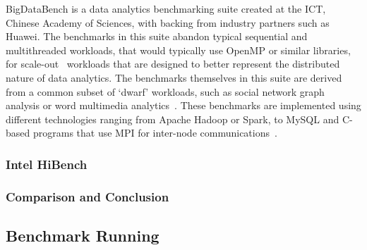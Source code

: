 \documentclass[12pt,a4paper]{article}
\begin{document}
            	BigDataBench is a data analytics benchmarking suite created at the ICT, Chinese Academy of Sciences, with backing from industry partners such as Huawei. The benchmarks in this suite abandon typical sequential and multithreaded workloads, that would typically use OpenMP or similar libraries, for scale-out~\cite{big-data-bench-home} workloads that are designed to better represent the distributed nature of data analytics. The benchmarks themselves in this suite are derived from a common subset of `dwarf' workloads, such as social network graph analysis or word multimedia analytics~\cite{dwarf-workloads-big-data}. These benchmarks are implemented using different technologies ranging from Apache Hadoop or Spark, to MySQL and C-based programs that use MPI for inter-node communications~\cite{big-data-bench-home}.
            
            \subsubsection{Intel HiBench}
            \label{ssub:intel_hibench}
            
            
            \subsubsection{Comparison and Conclusion}
            \label{ssub:comparison_and_conclusion}
            
            
        \subsection{Benchmark Running}
        \label{sub:benchmark_running}
        
    
\end{document}
